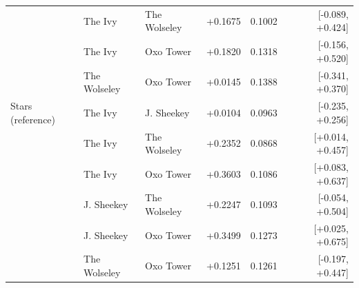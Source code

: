 \begin{table}[htbp]
\begin{tabular}{lllrrr}
   & The Ivy & The Wolseley & +0.1675 & 0.1002 & [-0.089, +0.424] \\
   & The Ivy & Oxo Tower & +0.1820 & 0.1318 & [-0.156, +0.520] \\
   & The Wolseley & Oxo Tower & +0.0145 & 0.1388 & [-0.341, +0.370] \\
\addlinespace
  Stars (reference) & The Ivy & J. Sheekey & +0.0104 & 0.0963 & [-0.235, +0.256] \\
   & The Ivy & The Wolseley & +0.2352 & 0.0868 & [+0.014, +0.457] \\
   & The Ivy & Oxo Tower & +0.3603 & 0.1086 & [+0.083, +0.637] \\
   & J. Sheekey & The Wolseley & +0.2247 & 0.1093 & [-0.054, +0.504] \\
   & J. Sheekey & Oxo Tower & +0.3499 & 0.1273 & [+0.025, +0.675] \\
   & The Wolseley & Oxo Tower & +0.1251 & 0.1261 & [-0.197, +0.447] \\
\bottomrule
\end{tabular}
\end{table}
